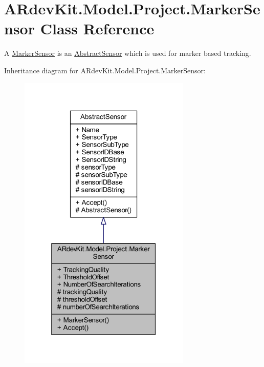 \hypertarget{class_a_rdev_kit_1_1_model_1_1_project_1_1_marker_sensor}{\section{A\-Rdev\-Kit.\-Model.\-Project.\-Marker\-Sensor Class Reference}
\label{class_a_rdev_kit_1_1_model_1_1_project_1_1_marker_sensor}
}


A \hyperlink{class_a_rdev_kit_1_1_model_1_1_project_1_1_marker_sensor}{Marker\-Sensor} is an \hyperlink{class_a_rdev_kit_1_1_model_1_1_project_1_1_abstract_sensor}{Abstract\-Sensor} which is used for marker based tracking.  




Inheritance diagram for A\-Rdev\-Kit.\-Model.\-Project.\-Marker\-Sensor\-:
\nopagebreak
\begin{figure}[H]
\begin{center}
\leavevmode
\includegraphics[width=232pt]{class_a_rdev_kit_1_1_model_1_1_project_1_1_marker_sensor__inherit__graph}
\end{center}
\end{figure}


